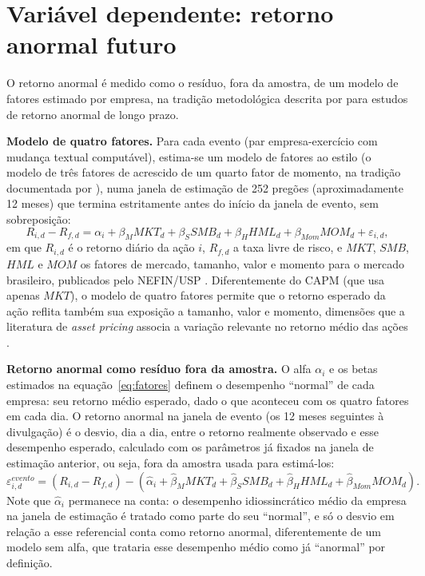 \documentclass[a4paper,12pt]{report}
\begin{document}
\section{Variável dependente: retorno anormal futuro}
\label{sec:var_dependente}

O retorno anormal é medido como o resíduo, fora da amostra, de um modelo de fatores estimado por empresa, na tradição metodológica descrita por  para estudos de retorno anormal de longo prazo.

\textbf{Modelo de quatro fatores.} Para cada evento (par empresa-exercício com mudança textual computável), estima-se um modelo de fatores ao estilo  (o modelo de três fatores de  acrescido de um quarto fator de momento, na tradição documentada por ), numa janela de estimação de 252 pregões (aproximadamente 12 meses) que termina estritamente antes do início da janela de evento, sem sobreposição:
\begin{equation}
    R_{i,d} - R_{f,d} = \alpha_i + \beta_M \mathit{MKT}_d + \beta_S \mathit{SMB}_d + \beta_H \mathit{HML}_d + \beta_{Mom} \mathit{MOM}_d + \varepsilon_{i,d},
    \label{eq:fatores}
\end{equation}
em que $R_{i,d}$ é o retorno diário da ação $i$, $R_{f,d}$ a taxa livre de risco, e $\mathit{MKT}$, $\mathit{SMB}$, $\mathit{HML}$ e $\mathit{MOM}$ os fatores de mercado, tamanho, valor e momento para o mercado brasileiro, publicados pelo NEFIN/USP \cite{nefin2026}. Diferentemente do CAPM (que usa apenas $\mathit{MKT}$), o modelo de quatro fatores permite que o retorno esperado da ação reflita também sua exposição a tamanho, valor e momento, dimensões que a literatura de \textit{asset pricing} associa a variação relevante no retorno médio das ações \cite{famafrench1992}.

\textbf{Retorno anormal como resíduo fora da amostra.} O alfa $\alpha_i$ e os betas estimados na equação~\ref{eq:fatores} definem o desempenho ``normal'' de cada empresa: seu retorno médio esperado, dado o que aconteceu com os quatro fatores em cada dia. O retorno anormal na janela de evento (os 12 meses seguintes à divulgação) é o desvio, dia a dia, entre o retorno realmente observado e esse desempenho esperado, calculado com os parâmetros já fixados na janela de estimação anterior, ou seja, fora da amostra usada para estimá-los:
\begin{equation}
    \varepsilon_{i,d}^{evento} = \left(R_{i,d} - R_{f,d}\right) - \left(\hat\alpha_i + \hat\beta_M \mathit{MKT}_d + \hat\beta_S \mathit{SMB}_d + \hat\beta_H \mathit{HML}_d + \hat\beta_{Mom} \mathit{MOM}_d\right).
    \label{eq:residuo_evento}
\end{equation}
Note que $\hat\alpha_i$ permanece na conta: o desempenho idiossincrático médio da empresa na janela de estimação é tratado como parte do seu ``normal'', e só o desvio em relação a esse referencial conta como retorno anormal, diferentemente de um modelo sem alfa, que trataria esse desempenho médio como já ``anormal'' por definição.
\end{document}
